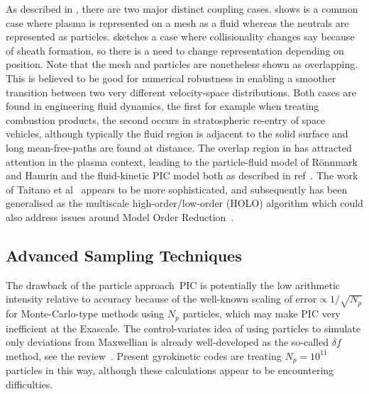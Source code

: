 As described in , there are two major distinct coupling cases. 
shows is a common case where
plasma is represented on a mesh as a fluid whereas the neutrals are represented as
particles.  sketches a case where collisionality changes say because of sheath
formation, so there is a need to change representation depending on position. Note that
the mesh and particles are nonetheless shown as overlapping. This is believed to be good for numerical
robustness in enabling a smoother transition between two very different velocity-space distributions.
Both cases are found in engineering fluid dynamics, the first for example when treating combustion
products, the second occurs in stratospheric re-entry of space vehicles, although typically 
the fluid region is adjacent to the solid surface and long mean-free-paths are found at
distance. The overlap region in 
has attracted attention in the plasma context, leading to the particle-fluid model of
R\"{o}nnmark and Hamrin and the fluid-kinetic PIC model both as described in ref~\cite{Ma14Flui}.
The work of Taitano et al~\cite{Ta13Deve} appears to be more sophisticated, and 
subsequently has been generalised as the multiscale high-order/low-order (HOLO) algorithm
which could also address issues around Model Order Reduction~\cite{Ch17Mult}.

\subsection{Advanced Sampling Techniques} \label{sec:sampling}
The drawback of the particle approach~PIC is potentially the low arithmetic intensity 
relative to accuracy because of the well-known scaling of error$\propto 1/\sqrt{N_p}$ for
Monte-Carlo-type methods using $N_p$ particles, which
may make PIC very inefficient at the Exascale.
The control-variates idea of using particles to simulate only
deviations from Maxwellian is already well-developed as the so-called $\delta f$ method,
see the review~\cite{Wa95a}. Present gyrokinetic codes are treating $N_p=10^{11}$ particles
in this way, although these calculations appear to be encountering difficulties.

